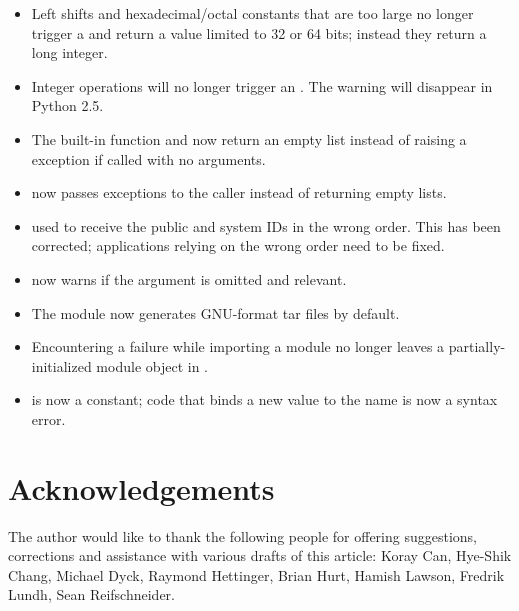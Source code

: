 \documentclass{howto}
\begin{document}
\begin{itemize}

\item Left shifts and hexadecimal/octal constants that are too 
  large no longer trigger a  and return 
  a value limited to 32 or 64 bits; instead they return a long integer.

\item Integer operations will no longer trigger an .
The  warning will disappear in Python 2.5.

\item The  built-in function and 
  now return  an empty list instead of raising a 
  exception if called with no arguments.

\item {} now passes exceptions to the caller
      instead of returning empty lists.

\item {} used to receive the public and
  system IDs in the wrong order.  This has been corrected; applications
  relying on the wrong order need to be fixed.

\item {} now warns if the  
 argument is omitted and relevant.

\item The  module now generates GNU-format tar files
by default.

\item Encountering a failure while importing a module no longer leaves
a partially-initialized module object in .  

\item {} is now a constant; code that binds a new value to 
the name  is now a syntax error.


\end{itemize}


\section{Acknowledgements \label{acks}}

The author would like to thank the following people for offering
suggestions, corrections and assistance with various drafts of this
article: Koray Can, Hye-Shik Chang, Michael Dyck, Raymond Hettinger, 
Brian Hurt, Hamish Lawson, Fredrik Lundh, Sean Reifschneider.
\end{document}
